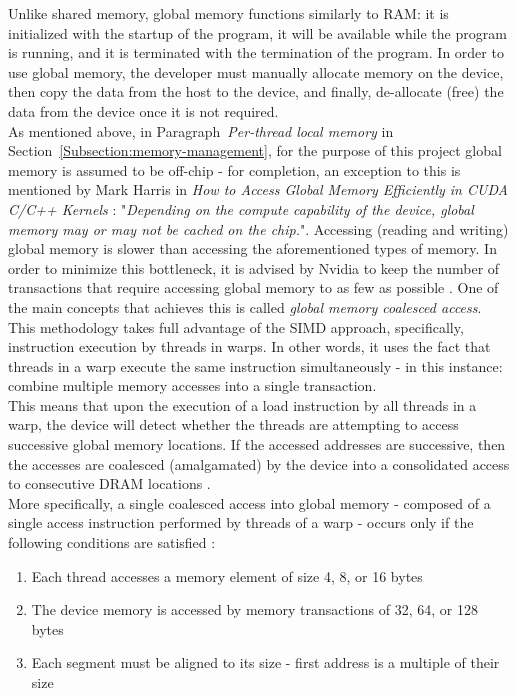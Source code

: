 Unlike shared memory, global memory functions similarly to RAM: it is initialized with the startup of the program, it will be available while the program is running, and it is terminated with the termination of the program. In order to use global memory, the developer must manually allocate memory on the device, then copy the data from the host to the device, and finally, de-allocate (free) the data from the device \cite{Harris7January2013} once it is not required. \\
As mentioned above, in Paragraph~\emph{Per-thread local memory} in Section~\ref{Subsection:memory-management}, for the purpose of this project global memory is assumed to be off-chip - for completion, an exception to this is mentioned by Mark Harris in \emph{How to Access Global Memory Efficiently in CUDA C/C++ Kernels} \cite{Harris7January2013}: "\textit{Depending on the compute capability of the device, global memory may or may not be cached on the chip.}". Accessing (reading and writing) global memory is slower than accessing the aforementioned types of memory. In order to minimize this bottleneck, it is advised by Nvidia to keep the number of transactions that require accessing global memory to as few as possible \cite{Harris7January2013}. One of the main concepts that achieves this is called \textit{global memory coalesced access}. This methodology takes full advantage of the SIMD approach, specifically, instruction execution by threads in warps. In other words, it uses the fact that threads in a warp execute the same instruction simultaneously - in this instance: combine multiple memory accesses into a single transaction. \\
This means that upon the execution of a load instruction by all threads in a warp, the device will detect whether the threads are attempting to access successive global memory locations. If the accessed addresses are successive, then the accesses are coalesced (amalgamated) by the device into a consolidated access to consecutive DRAM locations \cite{Cabrera4December2019}. \\
More specifically, a single coalesced access into global memory - composed of a single access instruction performed by threads of a warp - occurs only if the following conditions are satisfied \cite{xUOrKLpxlGjvTonr, NVIDIAMay2022}:

\begin{enumerate}\label{Enumerate:CUDA-global-memory-coalesced-access-requirements}
	\item Each thread accesses a memory element of size 4, 8, or 16 bytes
	\item The device memory is accessed by memory transactions of 32, 64, or 128 bytes
	\item Each segment must be aligned to its size - first address is a multiple of their size
\end{enumerate}

